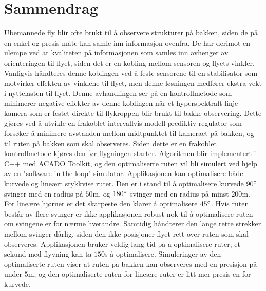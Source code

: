 \chapter*{Sammendrag}

Ubemannede fly blir ofte brukt til å observere strukturer på bakken, siden de på en enkel og presis måte kan samle inn informasjon ovenfra. De har derimot en ulempe ved at kvaliteten på informasjonen som samles inn avhenger av orienteringen til flyet, siden det er en kobling mellom sensoren og flyets vinkler. Vanligvis håndteres denne koblingen ved å feste sensorene til en stabilisator som motvirker effekten av vinklene til flyet, men denne løsningen medfører ekstra vekt i nyttelasten til flyet. Denne avhandlingen ser på en kontrollmetode som minimerer negative effekter av denne koblingen når et hyperspektralt linje-kamera som er festet direkte til flykroppen blir brukt til bakke-observering. Dette gjøres ved å utvikle en frakoblet intervallvis modell-prediktiv regulator som forsøker å minimere avstanden mellom midtpunktet til kameraet på bakken, og til ruten på bakken som skal observeres. Siden dette er en frakoblet kontrollmetode kjøres den før flygningen starter. Algoritmen blir implementert i C++ med ACADO Toolkit, og den optimaliserte ruten vil bli simulert ved hjelp av en "software-in-the-loop" simulator. Applikasjonen kan optimalisere både kurvede og lineært stykkvise ruter. Den er i stand til å optimalisere kurvede $90\degree$ svinger med en radius på $50$m, og $180\degree$ svinger med en radius på minst $200$m. For lineære hjørner er det skarpeste den klarer å optimalisere $45\degree$. Hvis ruten består av flere svinger er ikke applikasjonen robust nok til å optimalisere ruten om svingene er for nærme hverandre. Samtidig håndterer den lange rette strekker mellom svinger dårlig, siden den ikke posisjoner flyet rett over ruten som skal observeres. Applikasjonen bruker veldig lang tid på å optimalisere ruter, et sekund med flyvning kan ta $150$s å optimalisere. Simuleringer av den optimaliserte ruten viser at ruten på bakken kan observeres med en presisjon på under $5$m, og den optimaliserte ruten for lineære ruter er litt mer presis en for kurvede.